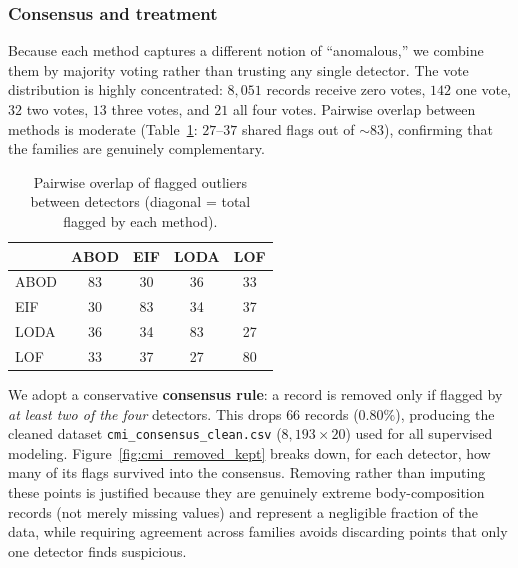 \subsubsection{Consensus and treatment}
Because each method captures a different notion of ``anomalous,'' we combine them by majority voting rather than trusting any single detector. The vote distribution is highly concentrated: $8{,}051$ records receive zero votes, $142$ one vote, $32$ two votes, $13$ three votes, and $21$ all four votes. Pairwise overlap between methods is moderate (Table~\ref{tab:cmi_overlap}: $27$--$37$ shared flags out of $\sim 83$), confirming that the families are genuinely complementary.\\

\begin{table}[H]
\centering
\small
\caption{Pairwise overlap of flagged outliers between detectors (diagonal = total flagged by each method).}
\label{tab:cmi_overlap}
\begin{tabular}{l c c c c}
\hline
 & ABOD & EIF & LODA & LOF \\
\hline
ABOD & 83 & 30 & 36 & 33 \\
EIF  & 30 & 83 & 34 & 37 \\
LODA & 36 & 34 & 83 & 27 \\
LOF  & 33 & 37 & 27 & 80 \\
\hline
\end{tabular}
\end{table}

We adopt a conservative \textbf{consensus rule}: a record is removed only if flagged by \emph{at least two of the four} detectors. This drops $66$ records ($0.80\%$), producing the cleaned dataset \texttt{cmi\_consensus\_clean.csv} ($8{,}193\times 20$) used for all supervised modeling. Figure~\ref{fig:cmi_removed_kept} breaks down, for each detector, how many of its flags survived into the consensus. Removing rather than imputing these points is justified because they are genuinely extreme body-composition records (not merely missing values) and represent a negligible fraction of the data, while requiring agreement across families avoids discarding points that only one detector finds suspicious.\\

